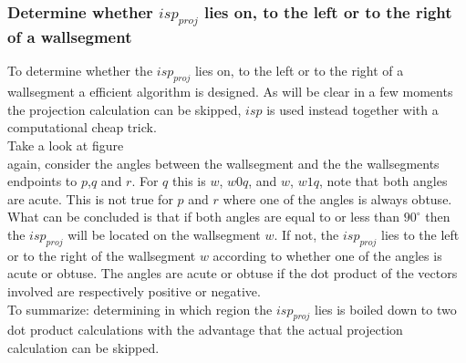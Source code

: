 \documentclass[10pt]{article}
\begin{document}


\subsubsection{Determine whether $isp_{proj}$ lies on, to the left or to the
right of a wallsegment}
To determine whether the $isp_{proj}$ lies on, to the left or to the right of a
wallsegment a efficient algorithm is designed. As will be clear in a few moments
the projection calculation can be skipped, $isp$ is used instead together with a
computational cheap trick.\\


Take a look at figure \\
again, consider the angles between the wallsegment and the
the wallsegments endpoints to $p$,$q$ and $r$.
For $q$ this is $w$, $w0 q$, and $w$, $w1 q$, note that both angles are acute.
This is not true for $p$ and $r$ where one of the angles is always obtuse.
What can be concluded is that if both angles are equal to or less than
$90^{\circ}$ then the $isp_{proj}$ will be located on the wallsegment $w$. If not,
the $isp_{proj}$ lies to the left or to the right of the wallsegment $w$ according to
whether one of the angles is acute or obtuse.  
The angles are acute or obtuse if the dot product of the vectors involved are
respectively positive or negative.\\
To summarize: determining in which region the $isp_{proj}$ lies is boiled down to
two dot product calculations with the advantage that the actual projection
calculation can be skipped.
\end{document}
